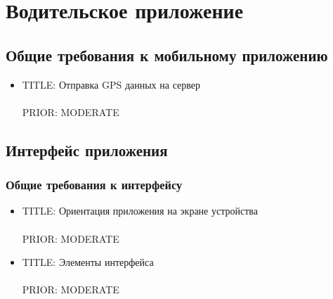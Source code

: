 \section{Водительское приложение}


  \subsection{Общие требования к мобильному приложению}

    \begin{itemize}

      \item{
        TITLE: Отправка GPS данных на сервер\\
        \\
        PRIOR: MODERATE\\}

    \end{itemize}

  \subsection{Интерфейс приложения}
   
    \subsubsection{Общие требования к интерфейсу}
      \begin{itemize}

        \item{
          TITLE: Ориентация приложения на экране устройства\\
          \\
          PRIOR: MODERATE\\}

        \item{
          TITLE: Элементы интерфейса\\
          \\
          PRIOR: MODERATE\\}

      \end{itemize}

